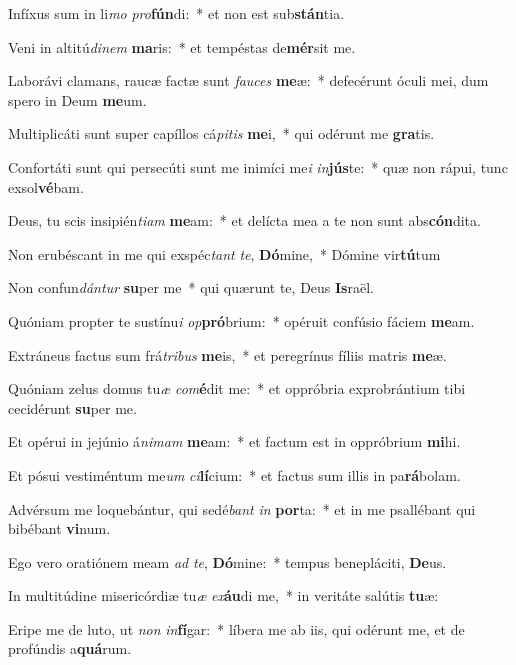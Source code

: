 \item Infíxus sum in li\textit{mo} \textit{pro}\textbf{fún}di:~* et non est sub\textbf{stán}tia.
\item Veni in altitú\textit{di}\textit{nem} \textbf{ma}ris:~* et tempéstas de\textbf{mér}sit me.
\item Laborávi clamans, raucæ factæ sunt \textit{fau}\textit{ces} \textbf{me}æ:~* defecérunt óculi mei, dum spero in Deum \textbf{me}um.
\item Multiplicáti sunt super capíllos cá\textit{pi}\textit{tis} \textbf{me}i,~* qui odérunt me \textbf{gra}tis.
\item Confortáti sunt qui persecúti sunt me inimíci me\textit{i} \textit{in}\textbf{jús}te:~* quæ non rápui, tunc exsol\textbf{vé}bam.
\item Deus, tu scis insipién\textit{ti}\textit{am} \textbf{me}am:~* et delícta mea a te non sunt abs\textbf{cón}dita.
\item Non erubéscant in me qui exspéc\textit{tant} \textit{te}, \textbf{Dó}mine,~* Dómine vir\textbf{tú}tum
\item Non confun\textit{dán}\textit{tur} \textbf{su}per me~* qui quærunt te, Deus \textbf{Is}raël.
\item Quóniam propter te sustínu\textit{i} \textit{op}\textbf{pró}brium:~* opéruit confúsio fáciem \textbf{me}am.
\item Extráneus factus sum frá\textit{tri}\textit{bus} \textbf{me}is,~* et peregrínus fíliis matris \textbf{me}æ.
\item Quóniam zelus domus tu\textit{æ} \textit{com}\textbf{é}dit me:~* et oppróbria exprobrántium tibi cecidérunt \textbf{su}per me.
\item Et opérui in jejúnio á\textit{ni}\textit{mam} \textbf{me}am:~* et factum est in oppróbrium \textbf{mi}hi.
\item Et pósui vestiméntum me\textit{um} \textit{ci}\textbf{lí}cium:~* et factus sum illis in pa\textbf{rá}bolam.
\item Advérsum me loquebántur, qui sedé\textit{bant} \textit{in} \textbf{por}ta:~* et in me psallébant qui bibébant \textbf{vi}num.
\item Ego vero oratiónem meam \textit{ad} \textit{te}, \textbf{Dó}mine:~* tempus benepláciti, \textbf{De}us.
\item In multitúdine misericórdiæ tu\textit{æ} \textit{ex}\textbf{áu}di me,~* in veritáte salútis \textbf{tu}æ:
\item Eripe me de luto, ut \textit{non} \textit{in}\textbf{fí}gar:~* líbera me ab iis, qui odérunt me, et de profúndis a\textbf{quá}rum.
